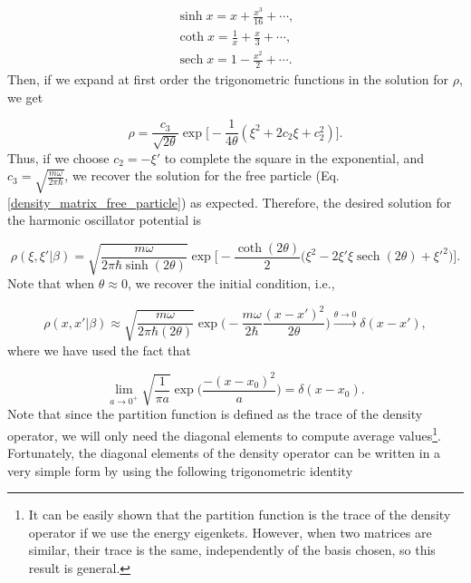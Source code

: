 \documentclass{article}
\DeclareMathOperator{\sech}{sech}
\begin{document}
\begin{equation}
    \begin{split}
        \sinh x = x + \frac{x^{3}}{16} + \cdots, \\ \coth x = \frac{1}{x} + \frac{x}{3} + \cdots, \\ \sech x = 1 - \frac{x^{2}}{2} + \cdots.
    \end{split}
\end{equation}
%
Then, if we expand at first order the trigonometric functions in the solution for $\rho$, we get

\begin{equation}
    \rho = \frac{c_{3}}{\sqrt{2\theta}} \exp \big[ -\frac{1}{4\theta}(\xi^{2} + 2c_{2}\xi + c_{2}^{2}) \big].
\end{equation}
%
Thus, if we choose $c_{2}=-\xi'$ to complete the square in the exponential, and $c_{3} = \sqrt{\frac{m\omega}{2\pi \hbar}}$, we recover the solution for the free particle (Eq. \ref{density_matrix_free_particle}) as expected. Therefore, the desired solution for the harmonic oscillator potential is

\begin{equation}\label{harmonic_osc_density_matrix}
    \rho(\xi, \xi'|\beta) = \sqrt{\frac{m\omega}{2\pi \hbar \sinh(2\theta)}} \exp \Bigg[ -\frac{\coth(2\theta)}{2} \big( \xi^{2} - 2\xi' \xi \sech(2\theta) + \xi'^{2} \big) \Big].
\end{equation}
%
Note that when $\theta \approx 0$, we recover the initial condition, i.e.,

\begin{equation}
    \rho(x, x' | \beta) \approx \sqrt{\frac{m\omega}{2\pi\hbar (2\theta)}} \exp \bigg(- \frac{m\omega}{2\hbar} \frac{(x-x')^{2}}{2\theta} \bigg) \xrightarrow{\theta \longrightarrow 0} \delta(x-x'),
\end{equation}
%
where we have used the fact that

\begin{equation}
    \lim_{a \to 0^{+}} \sqrt{\frac{1}{\pi a}} \exp \bigg(\frac{-(x-x_{0})^{2}}{a} \bigg) = \delta(x-x_{0}).
\end{equation}
%
Note that since the partition function is defined as the trace of the density operator, we will only need the diagonal elements to compute average values\footnote{It can be easily shown that the partition function is the trace of the density operator if we use the energy eigenkets. However, when two matrices are similar, their trace is the same, independently of the basis chosen, so this result is general.}. Fortunately, the diagonal elements of the density operator can be written in a very simple form by using the following trigonometric identity
\end{document}
